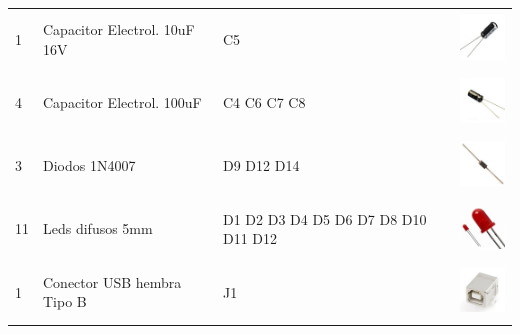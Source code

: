 \documentclass[letterpaper,10pt,english]{sphinxmanual}
\begin{document}
\begin{tabulary}{\linewidth}{|L|L|L|L|}
1
 & 
Capacitor Electrol. 10uF 16V
 & 
C5
 & 
\includegraphics[width=40pt,height=40pt]{capacitorelectrolitico.jpg}
\\

4
 & 
Capacitor Electrol. 100uF
 & 
C4 C6 C7 C8
 & 
\includegraphics[width=40pt,height=40pt]{capacitor-100uf.jpg}
\\

3
 & 
Diodos 1N4007
 & 
D9 D12 D14
 & 
\includegraphics[width=40pt,height=40pt]{diodo-1n4007.jpg}
\\

11
 & 
Leds difusos 5mm
 & 
D1 D2 D3 D4 D5 D6 D7 D8 D10 D11 D12
 & 
\includegraphics[width=40pt,height=40pt]{led-difusos-5mm.jpg}
\\

1
 & 
Conector USB hembra Tipo B
 & 
J1
 & 
\includegraphics[width=40pt,height=40pt]{conector-usb-b.jpg}
\\
\hline\end{tabulary}
\end{document}
